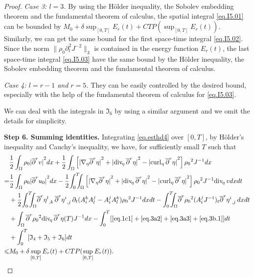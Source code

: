 \documentclass[12pt,twoside,reqno]{amsart}
\numberwithin{equation}{section}
\theoremstyle{definition}
\theoremstyle{remark}
\begin{document}
\begin{proof}
\emph{Case 3: $l=3$.} By using the H\"older inequality, the Sobolev embedding theorem and the fundamental theorem of calculus, the spatial integral \eqref{eq.I5.01} can be bounded by $M_0+\delta\sup_{[0,T]}E_r(t)+CTP(\sup_{[0,T]}E_r(t))$. Similarly, we can get the same bound for the first space-time integral \eqref{eq.I5.02}. Since the norm $\|{\rho_0}  {\partial}_t^2 J^{-2}\|_3$ is contained in the energy function $E_r(t)$, the last space-time integral \eqref{eq.I5.03} have the same bound by the H\"older inequality, the Sobolev embedding theorem and the fundamental theorem of calculus.

\emph{Case 4: $l=r-1$ and $r=5$.} They can be easily controlled by the desired bound, especially with the help of the fundamental theorem of calculus for \eqref{eq.I5.03}.

We can deal with the integrals in ${\mathfrak{I}}_6$ by using a similar argument and we omit the details for simplicity.

\textbf{Step 6. Summing identities.}
Integrating \eqref{eq.esthd4} over $[0,T]$, by H\"older's inequality and Cauchy's inequality,  we have, for sufficiently small $T$ such that
\begin{align*}
  &\frac{1}{2}\int_\Omega {\rho_0} {\vert{{\overline{\partial}}^r v}\vert}^2dx+\frac{1}{2}\int_\Omega \left[{\vert{{\nabla}_\eta {\overline{\partial}}^r\eta}\vert}^2+{\vert{{\mathrm{div}_{\!\eta}\,} {\overline{\partial}}^r \eta}\vert}^2-{\vert{{\mathrm{curl}_\eta\,} {\overline{\partial}}^r \eta}\vert}^2\right]{\rho_0}^2   J^{-1}dx\\
  =&\frac{1}{2}\int_\Omega {\rho_0} {\vert{{\overline{\partial}}^r u_0}\vert}^2dx-\frac1{2}{\int_0^T\!\!\!\!\int_\Omega }  \left[{\vert{{\nabla}_\eta {\overline{\partial}}^r\eta}\vert}^2+{\vert{{\mathrm{div}_{\!\eta}\,} {\overline{\partial}}^r \eta}\vert}^2-{\vert{{\mathrm{curl}_\eta\,} {\overline{\partial}}^r \eta}\vert}^2\right]{\rho_0}^2   J^{-1}{\mathrm{div}_{\!\eta}\,} vdxdt\\
  &+\frac{1}{2}{\int_0^T\!\!\!\!\int_\Omega }  {\overline{\partial}}^r{{{\eta^l}}_{,{k}}\,} {\overline{\partial}}^r {{{\eta^i}}_{,{j}}\,}{\partial}_t(A_i^k A_l^j-A_i^jA_l^k){\rho_0}^2   J^{-1}dxdt-{\int_0^T\!\!\!\!\int_\Omega }  {\overline{\partial}}^r{\rho_0}^2   (A^j_i J^{-1})_t{{{{\overline{\partial}}^r \eta^i}}_{,{j}}\,}dx dt\\
  &+\int_\Omega {\overline{\partial}}^r{\rho_0}^2   {\mathrm{div}_{\!\eta}\,}{\overline{\partial}}^r \eta(T)J^{-1}dx-\int_0^T[\eqref{eq.1c1}+\eqref{eq.3a2}+\eqref{eq.3a3} +\eqref{eq.3b.1}]dt\\
  &+\int_0^T[{\mathfrak{I}}_{4}+{\mathfrak{I}}_{5}+{\mathfrak{I}}_{6}]dt\\
  {\leqslant}& M_0+\delta\sup_{[0,T]}E_r(t)+CTP(\sup_{[0,T]}E_r(t)).
\end{align*}


\end{proof}
\end{document}
